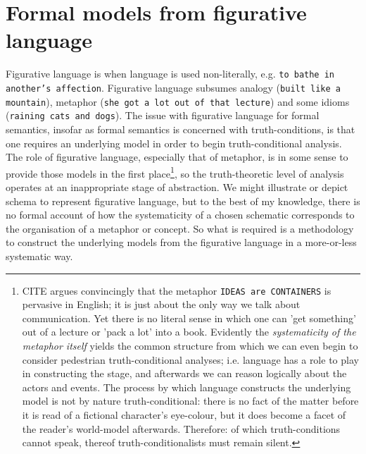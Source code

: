 \section{Formal models from figurative language}

Figurative language is when language is used non-literally, e.g. \texttt{to bathe in another's affection}. Figurative language subsumes analogy (\texttt{built like a mountain}), metaphor (\texttt{she got a lot out of that lecture}) and some idioms (\texttt{raining cats and dogs}). The issue with figurative language for formal semantics, insofar as formal semantics is concerned with truth-conditions, is that one requires an underlying model in order to begin truth-conditional analysis. The role of figurative language, especially that of metaphor, is in some sense to provide those models in the first place\footnote{\bR CITE \e argues convincingly that the metaphor \texttt{IDEAS are CONTAINERS} is pervasive in English; it is just about the only way we talk about communication. Yet there is no literal sense in which one can 'get something' out of a lecture or 'pack a lot' into a book. Evidently the \emph{systematicity of the metaphor itself} yields the common structure from which we can even begin to consider pedestrian truth-conditional analyses; i.e. language has a role to play in constructing the stage, and afterwards we can reason logically about the actors and events. The process by which language constructs the underlying model is not by nature truth-conditional: there is no fact of the matter before it is read of a fictional character's eye-colour, but it does become a facet of the reader's world-model afterwards. Therefore: of which truth-conditions cannot speak, thereof truth-conditionalists must remain silent.}, so the truth-theoretic level of analysis operates at an inappropriate stage of abstraction. We might illustrate or depict schema to represent figurative language, but to the best of my knowledge, there is no formal account of how the systematicity of a chosen schematic corresponds to the organisation of a metaphor or concept. So what is required is a methodology to construct the underlying models from the figurative language in a more-or-less systematic way.\\

